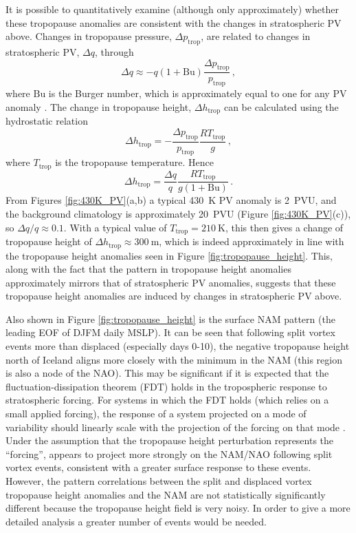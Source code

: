 It is possible to quantitatively examine (although only approximately) whether
these tropopause anomalies are consistent with the changes in stratospheric PV
above. Changes in tropopause pressure, $\Delta p_{\mathrm{trop}}$, are related
to changes in stratospheric PV, $\Delta q$, through
\begin{equation}
\Delta q \approx -q(1+\mathrm{Bu})\frac{\Delta
  p_{\mathrm{trop}}}{p_{\mathrm{trop}}} \, , 
\label{eqn:pv_trop}
\end{equation}
where $\mathrm{Bu}$ is the Burger number, which is approximately equal to one
for any PV anomaly \citep{Ambaum2002}. The change in tropopause height,
$\Delta h_{\mathrm{trop}}$ can be calculated using the hydrostatic relation
\begin{equation}
\Delta h_{\mathrm{trop}} = -\frac{\Delta p_{\mathrm{trop}}}{p_{\mathrm{trop}}}
\frac{R T_{\mathrm{trop}}}{g} \, , 
\end{equation} 
where $T_{\mathrm{trop}}$ is the tropopause temperature. Hence
\begin{equation}
\Delta h_{\mathrm{trop}} = \frac{\Delta q}{q}
\frac{RT_{\mathrm{trop}}}{g(1+\mathrm{Bu})} \, .
\end{equation}
From Figures \ref{fig:430K_PV}(a,b) a typical 430~K PV anomaly is 2~PVU, and the
background climatology is approximately 20~PVU (Figure \ref{fig:430K_PV}(c)), so
$\Delta q/q \approx 0.1$. With a typical value of
$T_{\mathrm{trop}} = 210~\mathrm{K}$, this then gives a change of tropopause
height of $\Delta h_{\mathrm{trop}} \approx 300~\mathrm{m}$, which is indeed
approximately in line with the tropopause height anomalies seen in Figure
\ref{fig:tropopause_height}. This, along with the fact that the pattern in
tropopause height anomalies approximately mirrors that of stratospheric PV
anomalies, suggests that these tropopause height anomalies are induced by
changes in stratospheric PV above.

Also shown in Figure \ref{fig:tropopause_height} is the surface NAM pattern (the
leading EOF of DJFM daily MSLP). It can be seen that following split vortex
events more than displaced (especially days 0-10), the negative tropopause
height north of Iceland aligns more closely with the minimum in the NAM (this
region is also a node of the NAO). This may be significant if it is expected
that the fluctuation-dissipation theorem (FDT) \citep{Nyquist1928} holds in the
tropospheric response to stratospheric forcing. For systems in which the FDT
holds (which relies on a small applied forcing), the response of a system
projected on a mode of variability should linearly scale with the projection of
the forcing on that mode \citep{Ring2008}. Under the assumption that the
tropopause height perturbation represents the ``forcing'', appears to project
more strongly on the NAM/NAO following split vortex events, consistent with a
greater surface response to these events. However, the pattern correlations
between the split and displaced vortex tropopause height anomalies and the NAM
are not statistically significantly different because the tropopause height
field is very noisy. In order to give a more detailed analysis a greater number
of events would be needed.



